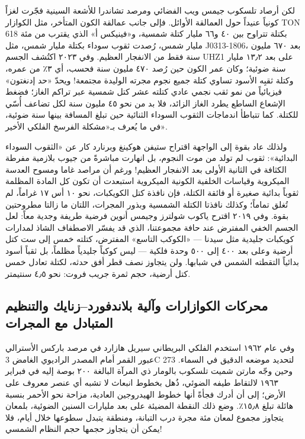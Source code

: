 \documentclass[12pt,a4paper,openany]{book}
\begin{document}
لكن أرصاد تلسكوب جيمس ويب الفضائي ومرصد تشاندرا للأشعة السينية فجّرت لغزاً كونياً عنيداً حول العمالقة الأوائل. فإلى جانب عمالقة الكون المتأخر، مثل الكوازار TON 618 بكتلة تتراوح بين ٤٠ و٦٦ مليار كتلة شمسية، و«فينيكس أ» الذي يقترب من مئة مليار شمس، رُصدت ثقوب سوداء بكتلة مليار شمس، مثل J0313-1806، بعد ٦٧٠ مليون سنة فقط من الانفجار العظيم. وفي ٢٠٢٣ اكتُشف الجسم UHZ1 على بعد ١٣٫٢ مليار سنة ضوئية؛ وكان عمر الكون حين رُصد ٤٧٠ مليون سنة فحسب، أي ٣٪ من عمره، وكتلة ثقبِه الأسود تساوي كتلة جميع نجوم مجرته الوليدة مجتمعة! ويحدّ «حد إدنغتون» فيزيائياً من نمو ثقب نجمي عادي كتلته عشر كتل شمسية عبر تراكم الغاز؛ فضغط الإشعاع الساطع يطرد الغاز الزائد، فلا بد من نحو ٤٥ مليون سنة لكل تضاعف أُسّي للكتلة. كما تتباطأ اندماجات الثقوب السوداء الثنائية حين تبلغ المسافة بينها سنة ضوئية، في ما يُعرف بـ«مشكلة الفرسخ الفلكي الأخير».


ولذلك عاد بقوة إلى الواجهة اقتراح ستيفن هوكينغ وبرنارد كار عن «الثقوب السوداء البدائية»: ثقوب لم تولد من موت النجوم، بل انهارت مباشرةً من جيوب بلازمية مفرطة الكثافة في الثانية الأولى بعد الانفجار العظيم! ورغم أن مراصد غاما ومسوح العدسة الميكروية وقياسات الخلفية الكونية الميكروية استبعدت أن تكون كل المادة المظلمة ثقوباً بدائية صغيرة أو فائقة الكتلة، فإن نافذة كتل الكويكبات، نحو ١٠ أس ١٧ غراماً، لم تُغلق تماماً؛ وكذلك نافذتا الكتلة الشمسية وبذور المجرات، اللتان ما زالتا مطروحتين بقوة. وفي ٢٠١٩ اقترح ياكوب شولترز وجيمس أنوين فرضية طريفة وجدية معاً: لعل الجسم الخفي المفترض عند حافة مجموعتنا، الذي قد يفسّر الاصطفاف الشاذ لمدارات كويكبات جليدية مثل سيدنا — «الكوكب التاسع» المفترض، كتلته خمس إلى ست كتل أرضية وعلى بعد ٤٠٠ إلى ٥٠٠ وحدة فلكية — ليس كوكباً جليدياً مظلماً، بل ثقباً أسود بدائياً التقطته الشمس في شبابها. ولن يتجاوز نصف قطر أفق حدثه، لكتلة تعادل خمس كتل أرضية، حجم ثمرة جريب فروت: نحو ٤٫٥ سنتيمتر.


\subsection*{محركات الكوازارات وآلية بلاندفورد–زنايك والتنظيم المتبادل مع المجرات}

وفي عام ١٩٦٢ استخدم الفلكي البريطاني سيريل هازارد في مرصد باركس الأسترالي عبور القمر أمام المصدر الراديوي الغامض 3C 273 لتحديد موضعه الدقيق في السماء. وحين وجّه مارتن شميت تلسكوب بالومار ذي المرآة البالغة ٢٠٠ بوصة إليه في فبراير ١٩٦٣ لالتقاط طيفه الضوئي، ذُهل بخطوط انبعاث لا تشبه أي عنصر معروف على الأرض؛ إلى أن أدرك فجأةً أنها خطوط الهيدروجين العادية، مزاحة نحو الأحمر بنسبة هائلة تبلغ ١٥٫٨٪. وضع ذلك النقطة المضيئة على بعد مليارات السنين الضوئية، بلمعان يتجاوز مجموع لمعان مئة مجرة درب التبانة، ومنطقة يتبدل سطوعها خلال أيام، فلا يمكن أن يتجاوز حجمها حجم النظام الشمسي!
\end{document}
